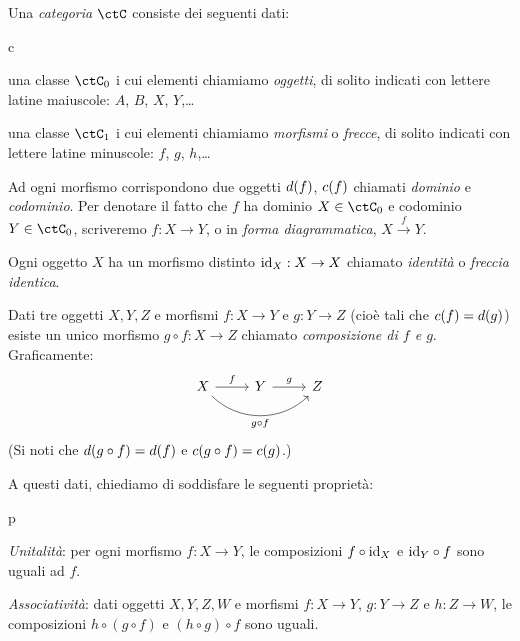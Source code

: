\begin{definition}[Categoria]
 Una \emph{categoria} $\ctC$ consiste dei seguenti dati:
 \begin{enumtag}{c}
  \item\label{c_1} una classe $\ctC_0$ i cui elementi chiamiamo \emph{oggetti}, di solito indicati con lettere latine maiuscole: $A$, $B$, $X$, $Y$,\dots
  \item\label{c_2} una classe $\ctC_1$ i cui elementi chiamiamo \emph{morfismi} o \emph{frecce}, di solito indicati con lettere latine minuscole: $f$, $g$, $h$,\dots
  \item\label{c_3} Ad ogni morfismo corrispondono due oggetti $d(f)$, $c(f)$ chiamati \emph{dominio} e \emph{codominio}. Per denotare il fatto che $f$ ha dominio $X\in\ctC_0$ e codominio $Y\in\ctC_0$, scriveremo $f:X\to Y$, o in \emph{forma diagrammatica}, $X \xrightarrow{f} Y$.
  \item\label{c_4} Ogni oggetto $X$ ha un morfismo distinto $\mathrm{id}_X:X\to X$ chiamato \emph{identità} o \emph{freccia identica}.
  \item\label{c_5} Dati tre oggetti $X,Y,Z$ e morfismi $f:X\to Y$ e $g:Y\to Z$ (cioè tali che $c(f)=d(g)$) esiste un unico morfismo $g\circ f:X\to Z$ chiamato \emph{composizione di $f$ e $g$}. Graficamente:
  \[
  \begin{tikzcd}
   X \ar{r}{f}
   \ar[rounded corners,out=-45, in=225]{rr}[swap]{g\circ f}
   & Y \ar{r}{g} & Z \\
   &&
  \end{tikzcd}
  \]
  (Si noti che $d(g\circ f)=d(f)$ e $c(g\circ f)=c(g)$.)
\end{enumtag}
  A questi dati, chiediamo di soddisfare le seguenti proprietà:
\begin{enumtag}{p}
  \item \label{p_1} \emph{Unitalità}: per ogni morfismo $f:X\to Y$, le composizioni $f\circ\mathrm{id}_X$ e $\mathrm{id}_Y\circ f$ sono uguali ad $f$.
  \item \label{p_2} \emph{Associatività}: dati oggetti $X,Y,Z,W$ e morfismi $f:X\to Y$, $g:Y\to Z$ e $h:Z\to W$, le composizioni $h\circ (g\circ f)$ e $(h\circ g)\circ f$ sono uguali.
 \end{enumtag}
\end{definition}
